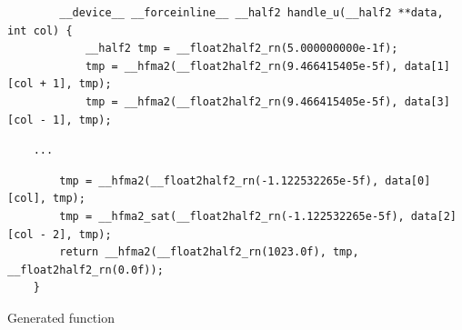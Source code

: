 \begin{table}[H]
\begin{minipage}[b]{.5\linewidth}
    \end{minipage}
    \caption{Comparison of the number of \gls{fma} operations required to get the desired output. On the left }
\end{table}



\begin{listing}[H]
    \begin{verbatim}
        __device__ __forceinline__ __half2 handle_u(__half2 **data, int col) {
            __half2 tmp = __float2half2_rn(5.000000000e-1f);
            tmp = __hfma2(__float2half2_rn(9.466415405e-5f), data[1][col + 1], tmp);
            tmp = __hfma2(__float2half2_rn(9.466415405e-5f), data[3][col - 1], tmp);
        \end{verbatim}
    \vspace{-26pt}
    \begin{verbatim}
    ...
    \end{verbatim}
    \vspace{-26pt}
    \begin{verbatim}
        tmp = __hfma2(__float2half2_rn(-1.122532265e-5f), data[0][col], tmp);
        tmp = __hfma2_sat(__float2half2_rn(-1.122532265e-5f), data[2][col - 2], tmp);
        return __hfma2(__float2half2_rn(1023.0f), tmp, __float2half2_rn(0.0f));
    }
    \end{verbatim}
    \caption{Generated function}
    \label{listing:generated_function}
\end{listing}